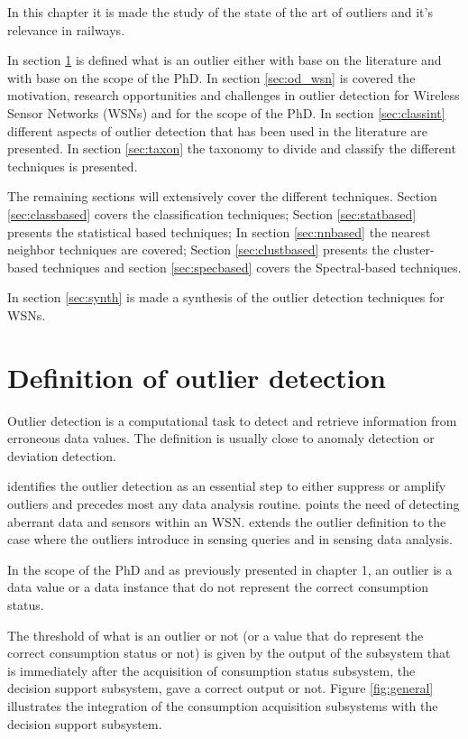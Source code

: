 In this chapter it is  made the study of the state of the art of outliers and it's relevance in railways.

In section \ref{sec:def} is defined what is an outlier either with base on the literature and with base on the scope of the PhD. 
In section \ref{sec:od_wsn} is covered the motivation, research opportunities and challenges in outlier detection for Wireless Sensor Networks (WSNs) and for the scope of the PhD. 
In section \ref{sec:classint} different aspects of outlier detection that has been used in the literature are presented. 
In section \ref{sec:taxon} the taxonomy to divide and classify the different techniques is presented.

The remaining sections will extensively cover the different techniques. Section \ref{sec:classbased} covers the classification techniques; Section \ref{sec:statbased} presents the statistical based techniques; In section \ref{sec:nnbased} the nearest neighbor techniques are covered; Section \ref{sec:clustbased} presents the cluster-based techniques and section \ref{sec:specbased} covers the Spectral-based techniques.

In section \ref{sec:synth} is made a synthesis of the outlier detection techniques for WSNs.


\section{Definition of outlier detection}
\label{sec:def}
Outlier detection is a computational task to detect and retrieve information from erroneous data values. The definition is usually close to anomaly detection or deviation detection. 

\cite{class:branch:2006} identifies the outlier detection as an essential step to either suppress or amplify outliers and precedes most any data analysis routine. \cite{nn:abid:2016} points the need of detecting aberrant data and sensors within an WSN. \cite{nn:zhuang:2006} extends the outlier definition to the case where the outliers introduce in sensing queries and in sensing data analysis.

\vspace{1em}

In the scope of the PhD and as previously presented in chapter 1, an outlier is a data value or a data instance that do not represent the correct consumption status.

The threshold of what is an outlier or not (or a value that do represent the correct consumption status or not) is given by the output of the subsystem that is immediately after the acquisition of consumption status subsystem, the decision support subsystem, gave a correct output or not. Figure \ref{fig:general} illustrates the integration of the consumption acquisition subsystems with the decision support subsystem.



